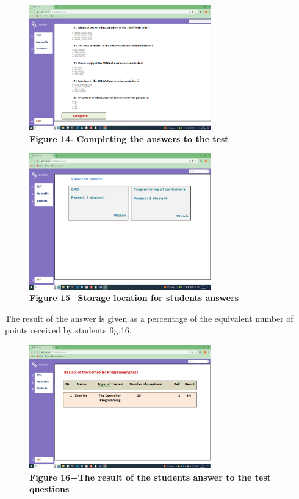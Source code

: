 \begin{figure}[H]
	\centering
	\includegraphics[width=0.7\textwidth]{assets/139}
	\caption*{\bfseries Figure 14- Completing the answers to the test}
\end{figure}



\begin{figure}[H]
	\centering
	\includegraphics[width=0.7\textwidth]{assets/140}
	\caption*{\bfseries Figure 15−Storage location for students\textquotesingle{}
	answers}
\end{figure}


\begin{multicols}{2}
The result of the answer is given as a percentage of the equivalent
number of points received by students fig.16.
\end{multicols}

\begin{figure}[H]
	\centering
	\includegraphics[width=0.7\textwidth]{assets/141}
	\caption*{\bfseries Figure 16−The result of the student\textquotesingle s answer to
	the test questions}
\end{figure}

